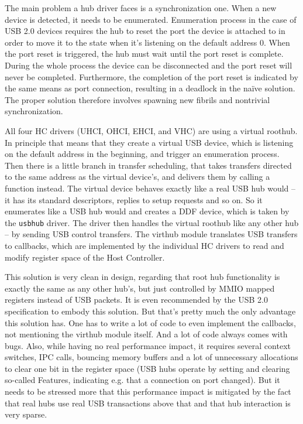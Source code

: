 The main problem a hub driver faces is a synchronization one. When a new device
is detected, it needs to be enumerated. Enumeration process in the case of USB 2.0
devices requires the hub to reset the port the device is attached to in order to move
it to the  state when it's listening on the default address 0.
When the port reset is triggered, the hub must wait until the port reset is
complete. During the whole process the device can be disconnected and the
port reset will never be completed. Furthermore, the completion of the port reset
is indicated by the same means as port connection, resulting in a deadlock in
the na\"ive solution. The proper solution therefore involves spawning new
fibrils and nontrivial synchronization.

All four HC drivers (UHCI, OHCI, EHCI, and VHC) are using a virtual roothub. In
principle that means that they create a virtual USB device, which is listening
on the default address in the beginning, and trigger an enumeration process.
Then there is a little branch in transfer scheduling, that takes transfers
directed to the same address as the virtual device's, and delivers them by
calling a function instead. The virtual device behaves exactly like a real USB
hub would -- it has its standard descriptors, replies to setup requests and so
on. So it enumerates like a USB hub would and creates a DDF device, which is
taken by the \texttt{usbhub} driver. The driver then handles the virtual
roothub like any other hub -- by sending USB control transfers. The virthub
module translates USB transfers to callbacks, which are implemented by the
individual HC drivers to read and modify register space of the Host Controller.

This solution is very clean in design, regarding that root hub functionality is
exactly the same as any other hub's, but just controlled by MMIO mapped
registers instead of USB packets. It is even recommended by the USB 2.0			%
specification to embody this solution. But that's pretty much the only advantage
this solution has. One has to write a lot of code to even implement the
callbacks, not mentioning the virthub module itself. And a lot of code always
comes with bugs. Also, while having no real performance impact, it requires
several context switches, IPC calls, bouncing memory buffers and a lot of
unnecessary allocations to clear one bit in the register space (USB hubs
operate by setting and clearing so-called Features, indicating e.g. that
a connection on port changed). But it needs to be stressed more that this
performance impact is mitigated by the fact that real hubs use real USB transactions
above that and that hub interaction is very sparse.


